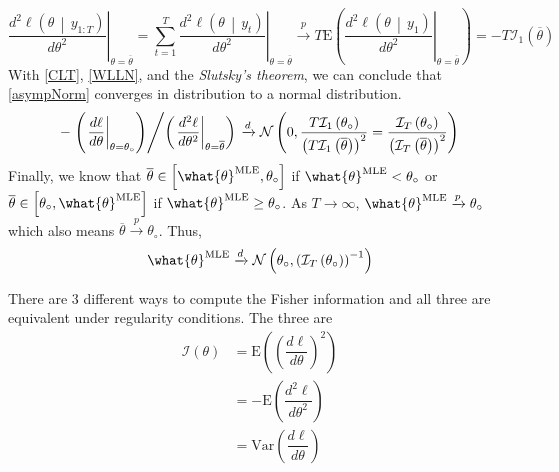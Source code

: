 \documentclass[answers]{exam}
\begin{document}
\begin{questions}
\begin{solution}
\begin{enumerate}[a)]
\begin{itemize}
      \begin{equation}\label{WLLN}
        \left.\dfrac{d^{2}\ell\left(\theta\,\middle|\,y_{1:T}\right)}{d\theta^{2}}\right|_{\theta=\overline{\theta}}=\sum_{t=1}^{T}\left.\dfrac{d^{2}\ell\left(\theta\,\middle|\,y_{t}\right)}{d\theta^{2}}\right|_{\theta=\overline{\theta}} \xrightarrow{p} T\mathrm{E}\left(\left.\dfrac{d^{2}\ell\left(\theta\,\middle|\,y_{1}\right)}{d\theta^{2}}\right|_{\theta=\overline{\theta}} \right) =-T\mathcal{I}_{1}\left(\overline{\theta}\right)
      \end{equation}
      With \ref{CLT}, \ref{WLLN}, and the \emph{Slutsky's theorem}, we can conclude that \ref{asympNorm} converges in distribution to a normal distribution.
      \begin{equation}
        -\left.\left(\left.\dfrac{d\ell}{d\theta}\right|_{\theta=\theta_{\circ}}\right)\middle/\left(\left.\dfrac{d^{2}\ell}{d\theta^{2}}\right|_{\theta=\overline{\theta}}\right)\right. \xrightarrow{d} \mathcal{N}\left(0,\dfrac{T\mathcal{I}_{1}\left(\theta_{\circ}\right)}{\left(T\mathcal{I}_{1}\left(\overline{\theta}\right)\right)^{2}}=\dfrac{\mathcal{I}_{T}\left(\theta_{\circ}\right)}{\left(\mathcal{I}_{T}\left(\overline{\theta}\right)\right)^{2}}\right)
      \end{equation}
      Finally, we know that $\overline{\theta}\in \left[\what{\theta}^{\text{MLE}},\theta_{\circ}\right]$ if $\what{\theta}^{\text{MLE}} < \theta_{\circ}$ or $\overline{\theta}\in \left[\theta_{\circ},\what{\theta}^{\text{MLE}}\right]$ if $\what{\theta}^{\text{MLE}} \geq \theta_{\circ}$. As $T\to\infty$, $\what{\theta}^{\text{MLE}}\xrightarrow{p}\theta_{\circ}$ which also means $\overline{\theta}\xrightarrow{p}\theta_{\circ}$. Thus,
      \begin{equation}
        \what{\theta}^{\text{MLE}} \xrightarrow{d} \mathcal{N}\left(\theta_{\circ},\left(\mathcal{I}_{T}\left(\theta_{\circ}\right)\right)^{-1}\right)
      \end{equation}
      \end{itemize}
    \end{enumerate}
    There are 3 different ways to compute the Fisher information and all three are equivalent under regularity conditions. The three are
    \begin{align}
      \mathcal{I}\left(\theta\right) &= \mathrm{E}\left(\left(\dfrac{d\ell}{d\theta}\right)^{2}\right)\\
      &= -\mathrm{E}\left(\dfrac{d^{2}\ell}{d\theta^{2}}\right)\\
      &= \mathrm{Var}\left(\dfrac{d\ell}{d\theta}\right)
    \end{align}
  \end{solution}
  \end{questions}
\end{document}
